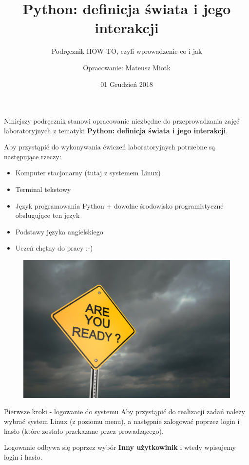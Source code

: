 \documentclass[10pt,ignorenonframetext,]{beamer}
\title{Python: definicja świata i jego interakcji}
\subtitle{Podręcznik HOW-TO, czyli wprowadzenie co i jak}
\author{Opracowanie: Mateusz Miotk}
\date{01 Grudzień 2018}
\begin{document}
\frame{\titlepage}

\begin{frame}
Niniejszy podręcznik stanowi opracowanie niezbędne do przeprowadzania zajęć laboratoryjnych z tematyki \textbf{Python: definicja świata i jego interakcji}.
\end{frame}

\begin{frame}
Aby przystąpić do wykonywania ćwiczeń laboratoryjnych potrzebne są następujące rzeczy: 
\begin{itemize}
	\item Komputer stacjonarny (tutaj z systemem Linux)
	\item Terminal tekstowy 
	\item Język programowania Python + dowolne środowisko programistyczne obsługujące ten język
	\item Podstawy języka angielskiego
	\item Uczeń chętny do pracy :-) 
\end{itemize}
\begin{figure}[!h]
	\centering
	\includegraphics[scale=0.75]{pictures/ready.jpeg}
\end{figure}
\end{frame}

\begin{frame}{Pierwsze kroki - logowanie do systemu}
  Aby przystąpić do realizacji zadań należy wybrać system Linux (z poziomu menu), a następnie zalogować poprzez login i hasło (które zostało przekazane przez prowadzącego). 
  
  Logowanie odbywa się poprzez wybór \textbf{Inny użytkowinik} i wtedy wpisujemy login i hasło.
\end{frame}
\end{document}
